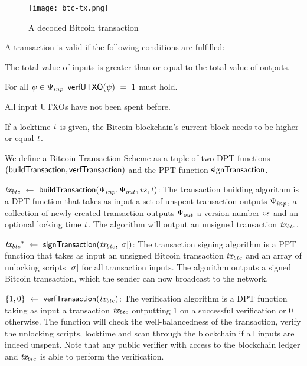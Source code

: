 \begin{figure}
    \begin{center}
        \texttt{[image: btc-tx.png]}
    \end{center}
    \caption{A decoded Bitcoin transaction} \label{fig:btc-tx}
\end{figure}

A transaction is valid if the following conditions are fulfilled:

\begin{asparaitem}
    \item The total value of inputs is greater than or equal to the total value of outputs.
    \item For all $\psi \in \Psi_{inp}$ $\mathsf{verfUTXO}(\psi) ~=~ 1$ must hold.
    \item All input UTXOs have not been spent before.
    \item If a locktime $\mathit{t}$ is given, the Bitcoin blockchain's current block needs to be higher or equal $\mathit{t}$.
\end{asparaitem}

\begin{definition}
    We define a Bitcoin Transaction Scheme as a tuple of two DPT functions $(\mathsf{buildTransaction}, \mathsf{verfTransaction})$ and the PPT function $\mathsf{signTransaction}$.
    \begin{asparaitem}
        \item $\mathit{tx_{btc}} ~\leftarrow~ \mathsf{buildTransaction}(\Psi_{inp},\Psi_{out},\mathit{vs},\mathit{t})$: The transaction building algorithm is a DPT function that takes as input a set of unspent transaction outputs $\Psi_{inp}$, a collection of newly created transaction outputs $\Psi_{out}$ a version number $\mathit{vs}$ and an optional locking time $\mathit{t}$.
        The algorithm will output an unsigned transaction $\mathit{tx_{btc}}$.
        \item $\mathit{tx_{btc}}^* ~\leftarrow~ \mathsf{signTransaction} (\mathit{tx_{btc}},[\mathit{\sigma}])$: The transaction
        signing algorithm is a PPT function that takes as input an unsigned Bitcoin transaction $\mathit{tx_{btc}}$ and an array
        of unlocking scripts $[\mathit{\sigma}]$ for all transaction inputs.
        The algorithm outputs a signed Bitcoin transaction, which the sender can now broadcast to the network.
        \item $\{ 1,0 \} ~\leftarrow~ \mathsf{verfTransaction}(\mathit{tx_{btc}})$: The verification algorithm is a DPT function taking as input a transaction $\mathit{tx_{btc}}$ outputting 1 on a successful verification or 0 otherwise.
        The function will check the well-balancedness of the transaction, verify the unlocking scripts, locktime and scan through the blockchain if all inputs are indeed unspent.
        Note that any public verifier with access to the blockchain ledger and $\mathit{tx_{btc}}$ is able to perform the verification.
    \end{asparaitem}
\end{definition}

